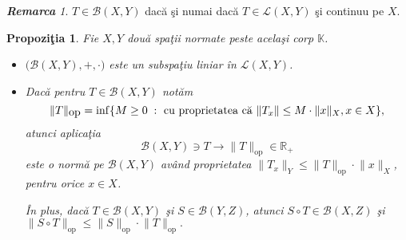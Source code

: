 \documentclass[ a4paper, 12pt]{report}
\newtheorem{prop}[theorem]{\bf Propozi\c tia }
\theoremstyle{definition}
\theoremstyle{remark}
\newtheorem{remarc}{\bf Remarca}[section]
\numberwithin{equation}{section}
\begin{document}
\begin{remarc}
$T \in \mathcal{B}(X,Y) $ dac\u a \c si numai dac\u a $T \in \mathcal{L}(X,Y)$ \c si continuu pe $X$.
\end{remarc}

\begin{prop} Fie $X, Y$ dou\u a spa\c tii normate peste acela\c si corp $\mathbb{K}$.
\begin{itemize}
\item[{\rm (a)}] $\Big(\mathcal{B}(X,Y), +, \cdot\Big)$ este un subspa\c tiu liniar \^in $\mathcal{L}(X,Y)$.

\item[{\rm (b)}] Dac\u a pentru $T \in \mathcal{B}(X,Y)$ not\u am
$$\lVert T \rVert_{\mbox{op}} = \inf \{ M \geq 0\; : \hbox{ cu proprietatea c\u a }  \lVert T_x \rVert \leq M \cdot \lVert x \rVert_{X}, x \in X\},$$ atunci aplica\c tia
$$\mathcal{B}(X,Y) \ni T \longrightarrow \lVert T \rVert_{\mbox{op}} \in \mathbb{R}_+$$ este o norm\u a pe $\mathcal{B}(X,Y)$ av\^and proprietatea $\lVert T_x \rVert_{Y} \leq \lVert T \rVert_{\mbox{op}} \cdot \lVert x \rVert_{X}$, pentru orice $x \in X$.

\^In plus, dac\u a $T \in \mathcal{B}(X,Y)$ \c si $S \in \mathcal{B}(Y,Z)$, atunci $S \circ T \in \mathcal{B}(X,Z)$ \c si $\lVert S \circ T \rVert_{\mbox{op}} \leq \lVert S \rVert_{\mbox{op}} \cdot \lVert T \rVert_{\mbox{op}}.$
\end{itemize}
\end{prop}
\end{document}
